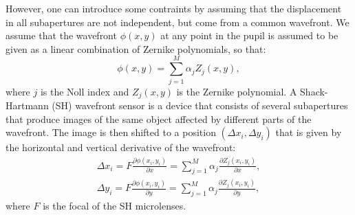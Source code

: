 \documentclass[iop,onecolumn]{emulateapj}
\begin{document}
However, one can introduce some contraints by assuming that the displacement in all
subapertures are not independent, but come from a common wavefront. We assume that the wavefront
$\phi(x,y)$ at any point in the pupil is assumed to be given as a linear combination of 
Zernike polynomials, so that:
\begin{equation}
\phi(x,y) = \sum_{j=1}^M \alpha_j Z_j(x,y),
\end{equation}
where $j$ is the Noll index and $Z_j(x,y)$ is the Zernike polynomial. A Shack-Hartmann (SH) wavefront
sensor is a device that consists of several subapertures that produce images of the same
object affected by different parts of the wavefront. The image is then shifted to a position
$(\Delta x_i,\Delta y_i)$ that is given by the horizontal and vertical derivative of the wavefront:
\begin{align}
\Delta x_i = F \frac{\partial \phi(x_i,y_i)}{\partial x} = \sum_{j=1}^M \alpha_j \frac{\partial Z_j(x_i,y_i)}{\partial x}, \nonumber \\
\Delta y_i = F \frac{\partial \phi(x_i,y_i)}{\partial y} = \sum_{j=1}^M \alpha_j \frac{\partial Z_j(x_i,y_i)}{\partial y},
\end{align}
where $F$ is the focal of the SH microlenses.
\end{document}
